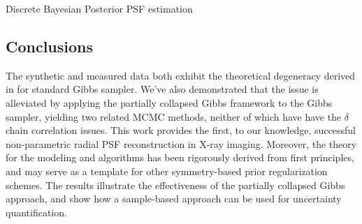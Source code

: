 \begin{chapter}{Discrete Bayesian Posterior PSF estimation}
\subsection{Conclusions} \label{sec:Conclusions}

The synthetic and measured data both exhibit the theoretical degeneracy derived in \cite{agapiou2014analysis} for standard Gibbs sampler.
We've also demonstrated that the issue is alleviated by applying the partially collapsed Gibbs framework to the Gibbs sampler, yielding two related MCMC methods, neither of which have have the $\delta$ chain correlation issues. 
This work provides the first, to our knowledge, successful non-parametric radial PSF reconstruction in X-ray imaging. 
Moreover, the theory for the modeling and algorithms has been rigorously derived from first principles, and may serve as a template for other symmetry-based prior regularization schemes.
The results illustrate the effectiveness of the partially collapsed Gibbs approach, and show how a sample-based approach can be used for uncertainty quantification.
\end{chapter}
